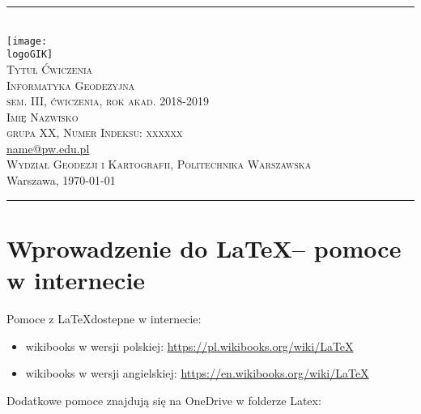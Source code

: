 \documentclass[10pt,a4paper]{article}
\makeatletter
\newcommand{\logoGIK}{settings/WGiK-znak.png}
\newcommand{\authorName}{Imię Nazwisko  \\ grupa XX, Numer Indeksu: xxxxxx}
\newcommand{\titeReport}{Tytuł Ćwiczenia} %
\newcommand{\titleLecture}{Informatyka Geodezyjna \\ sem. III, ćwiczenia, rok akad. 2018-2019} %
\newcommand{\mymail}{\href{mailto:name@pw.edu.pl}{name@pw.edu.pl}}
\newcommand{\faculty}{Wydział Geodezji i Kartografii}
\newcommand{\university}{Politechnika Warszawska}
\newcommand{\city}{Warszawa}
\makeatother
\begin{document}
\begin{center} 
\rule{\textwidth}{.5pt} \\
\vspace{1.0cm}
    \texttt{[image: \\logoGIK]}
\vspace{0.5cm} \\
	\Large \textsc{\titeReport}
\vspace{0.5cm} \\  
	\large \textsc{\titleLecture}
\vspace{0.5cm}\\
	\textsc{\authorName}  \\
	\mymail \\
	\textsc{\faculty}, \textsc{\university}  \\ 
	 \city, \today
\end{center} 
\rule{\textwidth}{1.5pt}



\tableofcontents 								%
\newpage
%



\section{Wprowadzenie do \LaTeX -- pomoce w internecie}
Pomoce z \LaTeX dostepne w internecie:
\begin{itemize}
\item wikibooks w wersji polskiej: \url{https://pl.wikibooks.org/wiki/LaTeX}
\item wikibooks w wersji angielskiej: \url{https://en.wikibooks.org/wiki/LaTeX}
\end{itemize}
Dodatkowe pomoce znajdują się na OneDrive w folderze Latex:



        
 


 










\end{document}
